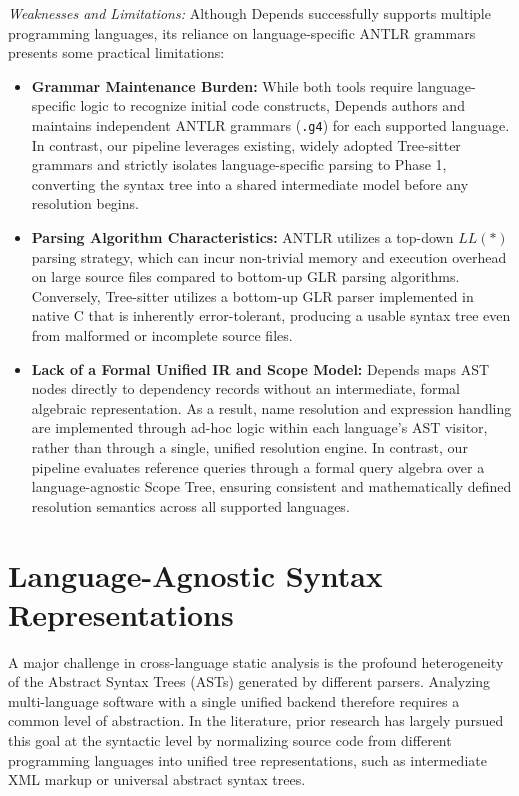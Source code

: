 \textit{Weaknesses and Limitations:} Although Depends successfully supports
multiple programming languages, its reliance on language-specific ANTLR
grammars presents some practical limitations:
\begin{itemize}
  \item \textbf{Grammar Maintenance Burden:} While both tools require
    language-specific logic to recognize initial code constructs, Depends
    authors and maintains independent ANTLR grammars (\texttt{.g4}) for each
    supported language. In contrast, our pipeline leverages existing,
    widely adopted Tree-sitter grammars and strictly isolates language-specific
    parsing to Phase 1, converting the syntax tree into a shared intermediate
    model before any resolution begins.
  \item \textbf{Parsing Algorithm Characteristics:} ANTLR utilizes a
    top-down $LL(*)$ parsing strategy, which can incur non-trivial
    memory and execution overhead on large source files compared to
    bottom-up GLR parsing algorithms. Conversely, Tree-sitter
    utilizes a bottom-up GLR parser implemented in native C that is
    inherently error-tolerant, producing a usable syntax tree even
    from malformed or incomplete source files.
  \item \textbf{Lack of a Formal Unified IR and Scope Model:} Depends maps
    AST nodes directly to dependency records without an intermediate, formal
    algebraic representation. As a result, name resolution and expression
    handling are implemented through ad-hoc logic within each language's AST
    visitor, rather than through a single, unified resolution engine. In
    contrast, our pipeline evaluates reference queries through a formal
    query algebra over a language-agnostic Scope Tree, ensuring consistent
    and mathematically defined resolution semantics across all supported
    languages.
\end{itemize}

\section{Language-Agnostic Syntax Representations}
\label{sec:language_agnostic_syntax}

A major challenge in cross-language static analysis is the profound
heterogeneity of the Abstract Syntax Trees (ASTs) generated by
different parsers.  Analyzing multi-language software with a single
unified backend therefore requires a common level of abstraction. In
the literature, prior research has largely pursued this goal at the
syntactic level by normalizing source code from different programming
languages into unified tree representations, such as intermediate XML
markup or universal abstract syntax trees.

